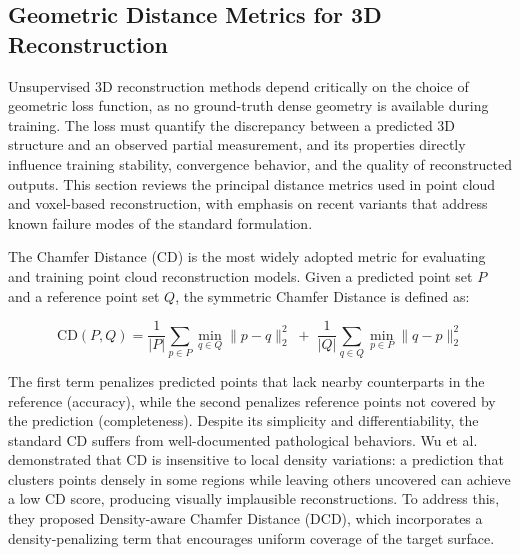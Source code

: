 \documentclass[a4paper, 12pt]{article}
\begin{document}
	\subsection{Geometric Distance Metrics for 3D Reconstruction}
	
	Unsupervised 3D reconstruction methods depend critically on the choice of
	geometric loss function, as no ground-truth dense geometry is available during
	training. The loss must quantify the discrepancy between a predicted 3D
	structure and an observed partial measurement, and its properties directly
	influence training stability, convergence behavior, and the quality of
	reconstructed outputs. This section reviews the principal distance metrics
	used in point cloud and voxel-based reconstruction, with emphasis on recent
	variants that address known failure modes of the standard formulation.
	
	The Chamfer Distance (CD) is the most widely adopted metric for evaluating
	and training point cloud reconstruction models. Given a predicted point set
	$P$ and a reference point set $Q$, the symmetric Chamfer Distance is defined
	as:
	
	\begin{equation}
		\text{CD}(P, Q) = \frac{1}{|P|} \sum_{p \in P} \min_{q \in Q} \| p - q \|_2^2
		\;+\; \frac{1}{|Q|} \sum_{q \in Q} \min_{p \in P} \| q - p \|_2^2
	\end{equation}
	
	The first term penalizes predicted points that lack nearby counterparts in the
	reference (accuracy), while the second penalizes reference points not covered
	by the prediction (completeness). Despite its simplicity and differentiability,
	the standard CD suffers from well-documented pathological behaviors. Wu et al.
	\cite{wu2021densityawarechamferdistancecomprehensive} demonstrated that CD is
	insensitive to local density variations: a prediction that clusters points
	densely in some regions while leaving others uncovered can achieve a low CD
	score, producing visually implausible reconstructions. To address this, they
	proposed Density-aware Chamfer Distance (DCD), which incorporates a
	density-penalizing term that encourages uniform coverage of the target surface.
	
\end{document}
